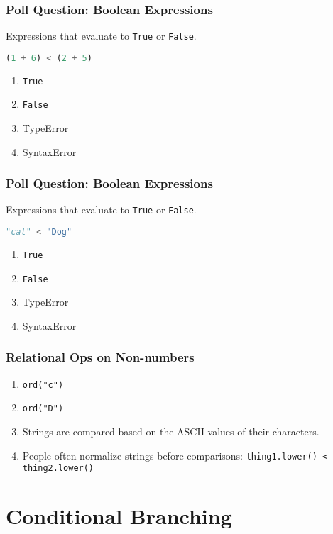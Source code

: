 \documentclass{beamer}
\begin{document}
%
%
\begin{frame}[fragile]
	\frametitle{Poll Question: Boolean Expressions}
	Expressions that evaluate to \lstinline|True| or \lstinline|False|. 
	\begin{lstlisting}[language=Python, autogobble]
	(1 + 6) < (2 + 5)
	\end{lstlisting}
	\vfill
	\begin{enumerate}[A]
		\item \lstinline|True|
		\item \lstinline|False|
		\item TypeError
		\item SyntaxError
	\end{enumerate}
\end{frame}

%
%
\begin{frame}[fragile]
	\frametitle{Poll Question: Boolean Expressions}
	Expressions that evaluate to \lstinline|True| or \lstinline|False|. 
	\begin{lstlisting}[language=Python, autogobble]
	"cat" < "Dog"
	\end{lstlisting}
	\vfill
	\begin{enumerate}[A]
		\item \lstinline|True|
		\item \lstinline|False|
		\item TypeError
		\item SyntaxError
	\end{enumerate}
\end{frame}

%
%
\begin{frame}[fragile]
	\frametitle{Relational Ops on Non-numbers}
	\begin{enumerate}[A]
		\item \lstinline|ord("c")| 
			\pause
		\item \lstinline|ord("D")| 
			\pause
		\item Strings are compared based on the ASCII values of their characters.
			\pause
		\item People often normalize strings before comparisons: \lstinline|thing1.lower() < thing2.lower()|
	\end{enumerate}
\end{frame}

\section{Conditional Branching}
\end{document}
